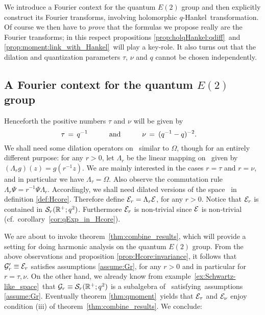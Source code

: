 
\begin{abs_chp}
We introduce a Fourier context for the quantum $E(2)$ group and then explicitly
construct its Fourier transforms, involving holomorphic \mbox{$q$-Hankel}\ transformation.
Of course we then have to {\em prove\/} that the formulas we
propose really are the Fourier transforms; in this respect propositions
\ref{prop:holqHankel:qdiff}\ and \ref{prop:moment:link_with_Hankel}\ will play
a key-role. It also turns out that the dilation and quantization parameters
$\tau$, $\nu$ and $q$ cannot be chosen independently.
\end{abs_chp}



\subsection{A Fourier context for the quantum $E(2)$ group}

Henceforth the positive numbers $\tau$ and $\nu$ will be given by
\begin{equation}\label{eq:tau_nu:value}
   \tau \,=\, q^{-1}   \andspace{3em}   \nu \,=\: (q^{-1}-q)^{-2}. \hspace{1em}
\end{equation}
We shall need some dilation operators on \HC\ similar to $\Omega$,
though for an entirely different purpose: for any $r>0$, let
$\Lambda_r$ be the linear mapping on \HC\ given by
$(\Lambda_r g)(z) = g(r^{-1} z)$.
We are mainly interested in the cases $r=\tau$ and $r=\nu$, and
in particular we have $\Lambda_\tau = \Omega$.
Also observe the commutation rule $\Lambda_r \Psi = r^{-1} \Psi \Lambda_r$.
Accordingly, we shall need dilated versions of the space \Hcore\ in
definition \ref{def:Hcore}\@. Therefore define $\Hcore_r = \Lambda_r \Hcore$,
for any $r>0$. Notice that $\Hcore_r$ is contained in ${\mathcal S}_r(\RR^+;q^2)$.
Furthermore $\Hcore_r$ is non-trivial since $\Hcore$ is non-trivial
(\mbox{cf.\ corollary \ref{cor:qExp_in_Hcore}}).


We are about to invoke \mbox{theorem \ref{thm:combine_results}}, which will provide
a setting for doing harmonic analysis on the quantum $E(2)$ group. From the
above observations and proposition \ref{prop:Hcore:invariance}, it
follows that ${\mathcal G}_r' \equiv \Hcore_r$ satisfies
assumptions \ref{assume:Gr}, for any $r>0$ and in particular for $r=\tau,\nu$.
On the other hand, we already know from \mbox{example \ref{ex:Schwartz-like_space}}\
that ${\mathcal G}_r \equiv {\mathcal S}_r(\RR^+;q^2)$
is a subalgebra of \HC\ \mbox{satisfying}\ assumptions \ref{assume:Gr}\@.
Eventually theorem \ref{thm:qmoment}\ yields that
$\Hcore_\tau$ and $\Hcore_\nu$ enjoy condition (iii) of
\mbox{theorem \ref{thm:combine_results}}\@. We conclude:



